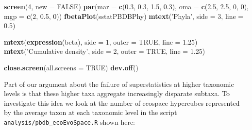 \documentclass[]{article}
\newenvironment{Shaded}{\begin{snugshade}}{\end{snugshade}}
\newcommand{\KeywordTok}[1]{\textcolor[rgb]{0.13,0.29,0.53}{\textbf{#1}}}
\newcommand{\DataTypeTok}[1]{\textcolor[rgb]{0.13,0.29,0.53}{#1}}
\newcommand{\DecValTok}[1]{\textcolor[rgb]{0.00,0.00,0.81}{#1}}
\newcommand{\FloatTok}[1]{\textcolor[rgb]{0.00,0.00,0.81}{#1}}
\newcommand{\StringTok}[1]{\textcolor[rgb]{0.31,0.60,0.02}{#1}}
\newcommand{\OtherTok}[1]{\textcolor[rgb]{0.56,0.35,0.01}{#1}}
\newcommand{\NormalTok}[1]{#1}
\begin{document}
\begin{Shaded}
\begin{Highlighting}[]
\KeywordTok{screen}\NormalTok{(}\DecValTok{4}\NormalTok{, }\DataTypeTok{new =} \OtherTok{FALSE}\NormalTok{)}
\KeywordTok{par}\NormalTok{(}\DataTypeTok{mar =} \KeywordTok{c}\NormalTok{(}\FloatTok{0.3}\NormalTok{, }\FloatTok{0.3}\NormalTok{, }\FloatTok{1.5}\NormalTok{, }\FloatTok{0.3}\NormalTok{), }\DataTypeTok{oma =} \KeywordTok{c}\NormalTok{(}\FloatTok{2.5}\NormalTok{, }\FloatTok{2.5}\NormalTok{, }\DecValTok{0}\NormalTok{, }\DecValTok{0}\NormalTok{), }
    \DataTypeTok{mgp =} \KeywordTok{c}\NormalTok{(}\DecValTok{2}\NormalTok{, }\FloatTok{0.5}\NormalTok{, }\DecValTok{0}\NormalTok{))}
\KeywordTok{fbetaPlot}\NormalTok{(sstatPBDBPhy)}
\KeywordTok{mtext}\NormalTok{(}\StringTok{'Phyla'}\NormalTok{, }\DataTypeTok{side =} \DecValTok{3}\NormalTok{, }\DataTypeTok{line =} \FloatTok{0.5}\NormalTok{)}

\KeywordTok{mtext}\NormalTok{(}\KeywordTok{expression}\NormalTok{(beta), }\DataTypeTok{side =} \DecValTok{1}\NormalTok{, }\DataTypeTok{outer =} \OtherTok{TRUE}\NormalTok{, }\DataTypeTok{line =} \FloatTok{1.25}\NormalTok{)}
\KeywordTok{mtext}\NormalTok{(}\StringTok{'Cumulative density'}\NormalTok{, }\DataTypeTok{side =} \DecValTok{2}\NormalTok{, }\DataTypeTok{outer =} \OtherTok{TRUE}\NormalTok{, }\DataTypeTok{line =} \FloatTok{1.25}\NormalTok{)}

\KeywordTok{close.screen}\NormalTok{(}\DataTypeTok{all.screens =} \OtherTok{TRUE}\NormalTok{)}
\KeywordTok{dev.off}\NormalTok{()}
\end{Highlighting}
\end{Shaded}

Part of our argument about the failure of superstatistics at higher
taxonomic levels is that these higher taxa aggregate increasingly
disparate subtaxa. To investigate this idea we look at the number of
ecospace hypercubes represented by the average taxon at each taxonomic
level in the script \texttt{analysis/pbdb\_ecoEvoSpace.R} shown here:
\end{document}
